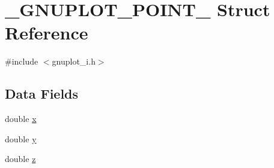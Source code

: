 \hypertarget{struct__GNUPLOT__POINT__}{\section{\-\_\-\-G\-N\-U\-P\-L\-O\-T\-\_\-\-P\-O\-I\-N\-T\-\_\- Struct Reference}
\label{struct__GNUPLOT__POINT__}
}


{\ttfamily \#include $<$gnuplot\-\_\-i.\-h$>$}

\subsection*{Data Fields}
\begin{DoxyCompactItemize}
\item 
double \hyperlink{struct__GNUPLOT__POINT___a129dd22f6309cf8995ad29a6dbc0d06e}{x}
\item 
double \hyperlink{struct__GNUPLOT__POINT___adf97eda67c096181c0b7b4f80109b170}{y}
\item 
double \hyperlink{struct__GNUPLOT__POINT___a3e9a5edcd95894b58c9719b0eb2dae1e}{z}
\end{DoxyCompactItemize}


